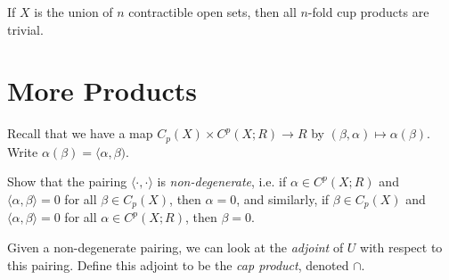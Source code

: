 \begin{exercise}
  If $X$ is the union of $n$
  contractible
  open sets, then all $n$-fold
  cup products are trivial.
\end{exercise}

\section{More Products}

\begin{remark}
  Recall that we have a map
  $C_p(X) \times C^p(X; R) \to R$ by
  $(\beta, \alpha) \mapsto \alpha(\beta)$.
  Write $\alpha(\beta) = \langle \alpha, \beta)$.
\end{remark}

\begin{exercise}
  Show that the pairing $\langle \cdot, \cdot \rangle$
  is \emph{non-degenerate}, i.e.
  if $\alpha \in C^p(X; R)$ and
  $\langle \alpha, \beta \rangle = 0$
  for all $\beta \in C_p(X)$, then
  $\alpha = 0$, and similarly,
  if $\beta \in C_p(X)$ and
  $\langle \alpha, \beta \rangle = 0$
  for all $\alpha \in C^p(X; R)$, then
  $\beta = 0$.
\end{exercise}

\begin{definition}
  Given a non-degenerate pairing, we can
  look at the \emph{adjoint} of $U$
  with respect to this pairing.
  Define this adjoint to be the
  \emph{cap product}, denoted $\cap$.
\end{definition}
